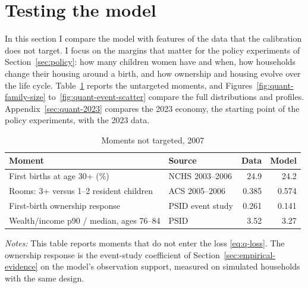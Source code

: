 
\section{Testing the model}
\label{sec:quant-fit}

In this section I compare the model with features of the data that the
calibration does not target. I focus on the margins that matter for the
policy experiments of Section~\ref{sec:policy}: how many children women have
and when, how households change their housing around a birth, and how
ownership and housing evolve over the life cycle.
Table~\ref{tab:quant-untargeted} reports the untargeted moments, and
Figures~\ref{fig:quant-family-size} to~\ref{fig:quant-event-scatter} compare
the full distributions and profiles. Appendix~\ref{sec:quant-2023} compares
the 2023 economy, the starting point of the policy experiments, with the
2023 data.

\begin{table}[t]
\centering
\caption{Moments not targeted, 2007}
\label{tab:quant-untargeted}
\small
\begin{tabularx}{\textwidth}{@{}X l r r@{}}
\toprule
Moment & Source & Data & Model \\
\midrule
First births at age 30+ (\%) & NCHS 2003--2006 & 24.9 & 24.2 \\
Rooms: 3+ versus 1--2 resident children & ACS 2005--2006 & 0.385 & 0.574 \\
First-birth ownership response & PSID event study & 0.261 & 0.141 \\
Wealth/income p90 / median, ages 76--84 & PSID & 3.52 & 3.27 \\
\bottomrule
\end{tabularx}
\par\smallskip
\begin{minipage}{0.95\linewidth}
\footnotesize\textit{Notes:} This table reports moments that do not enter
the loss \eqref{eq:q-loss}. The ownership response is the event-study
coefficient of Section~\ref{sec:empirical-evidence} on the model's
observation support, measured on simulated households with the same design.
\end{minipage}
\end{table}

